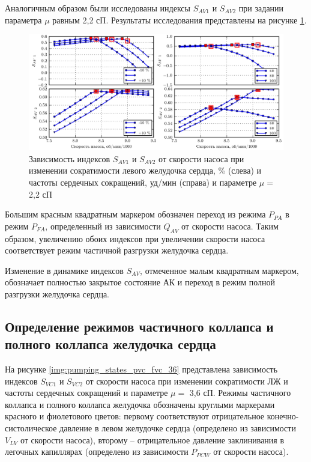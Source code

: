 Аналогичным образом были исследованы индексы $S_{AV1}$ и $S_{AV2}$ при задании параметра $\mu$ равным 2,2 сП. Результаты исследования представлены на рисунке \ref{img:pumping_states_pa_fa_22}.

\begin{figure}[!ht] 
  \center
  \includegraphics [scale=1.0] {../images/c3_pa_fa_22}
  \caption{Зависимость индексов $S_{AV1}$ и $S_{AV2}$ от скорости насоса при изменении сократимости левого желудочка сердца, \% (слева) и частоты сердечных сокращений, уд/мин (справа) и параметре $\mu =$ 2,2 сП} 
  \label{img:pumping_states_pa_fa_22}  
\end{figure}

Большим красным квадратным маркером обозначен переход из режима $P_{PA}$ в режим $P_{FA}$, определенный из зависимости $Q_{AV}$ от скорости насоса. Таким образом, увеличению обоих индексов при увеличении скорости насоса соответствует режим частичной разгрузки желудочка сердца. 

Изменение в динамике индексов $S_{AV}$, отмеченное малым квадратным маркером, обозначает полностью закрытое состояние АК и переход в режим полной разгрузки желудочка сердца. %

\subsection*{Определение режимов частичного коллапса и полного коллапса желудочка сердца}

На рисунке \ref{img:pumping_states_pvc_fvc_36} представлена зависимость индексов $S_{VC1}$ и $S_{VC2}$ от скорости насоса при изменении сократимости ЛЖ и частоты сердечных сокращений и параметре $\mu =$ 3,6 сП. Режимы частичного коллапса и полного коллапса желудочка обозначены круглыми маркерами красного и фиолетового цветов: первому соответствуют отрицательное конечно-систолическое давление в левом желудочке сердца (определено из зависимости $V_{LV}$ от скорости насоса), второму -- отрицательное давление заклинивания в легочных капиллярах (определено из зависимости $P_{PCW}$ от скорости насоса). 

